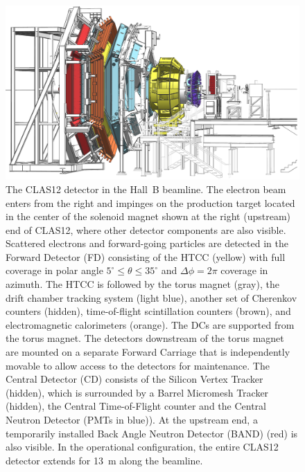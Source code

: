 \documentclass[final,3p,twocolumn]{elsarticle}
\begin{document}
\begin{figure}[t]
\centering
\centerline{\includegraphics[width=1.8\columnwidth]{CLAS12-side-3.png}}
\caption{The CLAS12 detector in the Hall~B beamline. The electron beam enters from the right and impinges on
the production target located in the center of the solenoid magnet shown at the right (upstream) end of CLAS12,
where other detector components are also visible. Scattered electrons and forward-going particles are detected
in the Forward Detector (FD) consisting of the HTCC (yellow) with full coverage in polar angle
$5^\circ \le \theta \le 35^\circ$ and $\Delta \phi = 2\pi$ coverage in azimuth. The HTCC is followed by the
torus magnet (gray), the drift chamber tracking system (light blue), another set of Cherenkov counters (hidden),
time-of-flight scintillation counters (brown), and electromagnetic calorimeters (orange). The DCs are supported from
the torus magnet. The detectors downstream of the torus magnet are mounted on a separate Forward Carriage that
is independently movable to allow access to the detectors for maintenance. The Central Detector (CD) consists of the
Silicon Vertex Tracker (hidden), which is surrounded by a Barrel Micromesh Tracker (hidden), the Central
Time-of-Flight counter and the Central Neutron Detector (PMTs in blue)). At the upstream end, a temporarily
installed Back Angle Neutron Detector (BAND) (red) is also visible. In the operational configuration, the entire
CLAS12 detector extends for 13~m along the beamline.} 
\label{clas12}
\end{figure}
\end{document}
